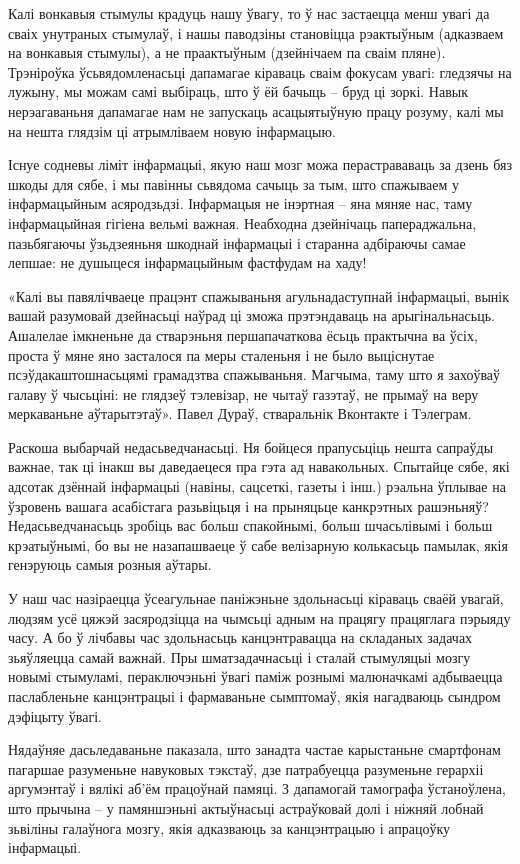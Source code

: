 Калі вонкавыя стымулы крадуць нашу ўвагу, то ў нас застаецца менш увагі да сваіх унутраных стымулаў, і нашы паводзіны становіцца рэактыўным (адказваем на вонкавыя стымулы), а не праактыўным (дзейнічаем па сваім пляне). Трэніроўка ўсьвядомленасьці дапамагае кіраваць сваім фокусам увагі: гледзячы на лужыну, мы можам самі выбіраць, што ў ёй бачыць – бруд ці зоркі. Навык нерэагаваньня дапамагае нам не запускаць асацыятыўную працу розуму, калі мы на нешта глядзім ці атрымліваем новую інфармацыю.

Існуе содневы ліміт інфармацыі, якую наш мозг можа перастрававаць за дзень бяз шкоды для сябе, і мы павінны сьвядома сачыць за тым, што спажываем у інфармацыйным асяродзьдзі. Інфармацыя не інэртная – яна мяняе нас, таму інфармацыйная гігіена вельмі важная. Неабходна дзейнічаць папераджальна, пазьбягаючы ўзьдзеяньня шкоднай інфармацыі і старанна адбіраючы самае лепшае: не душыцеся інфармацыйным фастфудам на хаду!

«Калі вы павялічваеце працэнт спажываньня агульнадаступнай інфармацыі, вынік вашай разумовай дзейнасьці наўрад ці зможа прэтэндаваць на арыгінальнасьць. Ашалелае імкненьне да стварэньня першапачаткова ёсьць практычна ва ўсіх, проста ў мяне яно засталося па меры сталеньня і не было выціснутае псэўдакаштошнасьцямі грамадзтва спажываньня. Магчыма, таму што я захоўваў галаву ў чысьціні: не глядзеў тэлевізар, не чытаў газэтаў, не прымаў на веру меркаваньне аўтарытэтаў». Павел Дураў, стваральнік Вконтакте і Тэлеграм. 

Раскоша выбарчай недасьведчанасьці. Ня бойцеся прапусьціць нешта сапраўды важнае, так ці інакш вы даведаецеся пра гэта ад навакольных. Спытайце сябе, які адсотак дзённай інфармацыі (навіны, сацсеткі, газеты і інш.) рэальна ўплывае на ўзровень вашага асабістага разьвіцьця і на прыняцьце канкрэтных рашэньняў? Недасьведчанасьць зробіць вас больш спакойнымі, больш шчасьлівымі і больш крэатыўнымі, бо вы не назапашваеце ў сабе велізарную колькасьць памылак, якія генэруюць самыя розныя аўтары.

У наш час назіраецца ўсеагульнае паніжэньне здольнасьці кіраваць сваёй увагай, людзям усё цяжэй засяродзіцца на чымсьці адным на працягу працяглага пэрыяду часу. А бо ў лічбавы час здольнасьць канцэнтравацца на складаных задачах зьяўляецца самай важнай. Пры шматзадачнасьці і сталай стымуляцыі мозгу новымі стымуламі, пераключэньні ўвагі паміж рознымі малюначкамі адбываецца паслабленьне канцэнтрацыі і фармаваньне сымптомаў, якія нагадваюць сындром дэфіцыту ўвагі.

Нядаўняе дасьледаваньне паказала, што занадта частае карыстаньне смартфонам пагаршае разуменьне навуковых тэкстаў, дзе патрабуецца разуменьне герархіі аргумэнтаў і вялікі аб'ём працоўнай памяці. З дапамогай тамографа ўстаноўлена, што прычына – у памяншэньні актыўнасьці астраўковай долі і ніжняй лобнай зьвіліны галаўнога мозгу, якія адказваюць за канцэнтрацыю і апрацоўку інфармацыі.

